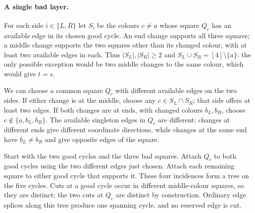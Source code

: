 \paragraph{A single bad layer.}
For each side $i\in\{L,R\}$ let $S_i$ be the colours $c\ne a$
whose square $Q_c$ has an available edge in its chosen good cycle.
An end change supports all three squares; a middle change supports
the two squares other than its changed colour, with at least two
available edges in each. Thus $|S_L|,|S_R|\ge2$ and
$S_L\cup S_R=[4]\setminus\{a\}$: the only possible exception would
be two middle changes to the same colour, which would give $t=s$.

We can choose a common square $Q_c$ with different available edges
on the two sides. If either change is at the middle, choose any
$c\in S_L\cap S_R$; that side offers at least two edges.
If both changes are at ends, with changed colours $b_L,b_R$, choose
$c\notin\{a,b_L,b_R\}$. The available singleton edges in $Q_c$
are different: changes at different ends give different coordinate
directions, while changes at the same end have $b_L\ne b_R$ and
give opposite edges of the square.

Start with the two good cycles and the three bad squares.
Attach $Q_c$ to both good cycles using the two different edges just
chosen. Attach each remaining square to either good cycle that
supports it. These four incidences form a tree on the five cycles.
Cuts at a good cycle occur in different middle-colour squares, so
they are distinct; the two cuts at $Q_c$ are distinct by construction.
Ordinary edge splices along this tree produce one spanning cycle,
and no reserved edge is cut.
